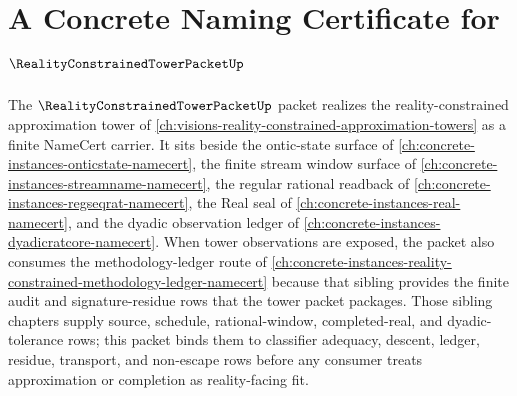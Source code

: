 \chapter{A Concrete Naming Certificate for $\RealityConstrainedTowerPacketUp$}
\label{ch:concrete-instances-realityconstrainedtowerpacket-namecert}

The $\RealityConstrainedTowerPacketUp$ packet realizes the reality-constrained approximation tower of \autoref{ch:visions-reality-constrained-approximation-towers} as a finite NameCert carrier. It sits beside the ontic-state surface of \autoref{ch:concrete-instances-onticstate-namecert}, the finite stream window surface of \autoref{ch:concrete-instances-streamname-namecert}, the regular rational readback of \autoref{ch:concrete-instances-regseqrat-namecert}, the Real seal of \autoref{ch:concrete-instances-real-namecert}, and the dyadic observation ledger of \autoref{ch:concrete-instances-dyadicratcore-namecert}. When tower observations are exposed, the packet also consumes the methodology-ledger route of \autoref{ch:concrete-instances-reality-constrained-methodology-ledger-namecert} because that sibling provides the finite audit and signature-residue rows that the tower packet packages. Those sibling chapters supply source, schedule, rational-window, completed-real, and dyadic-tolerance rows; this packet binds them to classifier adequacy, descent, ledger, residue, transport, and non-escape rows before any consumer treats approximation or completion as reality-facing fit.

